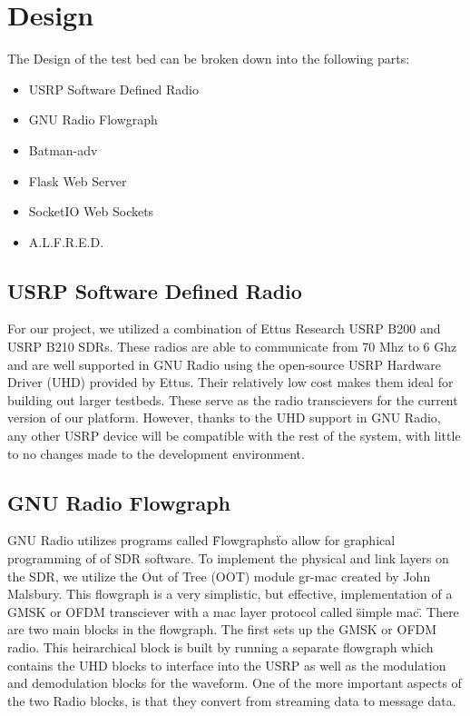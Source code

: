 \section{Design}

The Design of the test bed can be broken down into the following parts:

\begin{itemize}
	\item USRP Software Defined Radio
	\item GNU Radio Flowgraph
	\item Batman-adv
	\item Flask Web Server
	\item SocketIO Web Sockets
	\item A.L.F.R.E.D. 
\end{itemize}

\subsection{USRP Software Defined Radio}

For our project, we utilized a combination of Ettus Research USRP B200 and USRP B210 SDRs. These radios are able to communicate from 70 Mhz to 6 Ghz and are well supported in GNU Radio using the open-source USRP Hardware Driver (UHD) provided by Ettus. Their relatively low cost makes them ideal for building out larger testbeds. These serve as the radio transcievers for the current version of our platform. However, thanks to the UHD support in GNU Radio, any other USRP device will be compatible with the rest of the system, with little to no changes made to the development environment. 

\subsection{GNU Radio Flowgraph}

GNU Radio utilizes programs called \"Flowgraphs\" to allow for graphical programming of of SDR software. To implement the physical and link layers on the SDR, we utilize the Out of Tree (OOT) module gr-mac created by John Malsbury. This flowgraph is a very simplistic, but effective, implementation of a GMSK or OFDM transciever with a mac layer protocol called \"simple mac\". There are two main blocks in the flowgraph. The first sets up the GMSK or OFDM radio. This heirarchical block is built by running a separate flowgraph which contains the UHD blocks to interface into the USRP as well as the modulation and demodulation blocks for the waveform. One of the more important aspects of the two Radio blocks, is that they convert from streaming data to message data. 


